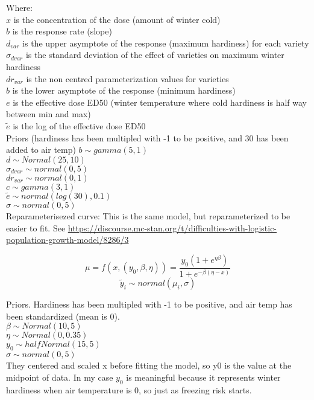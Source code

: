 \documentclass[11pt,letter]{article}
\begin{document}
Where:\\
	$x$ is the concentration of the dose (amount of winter cold) \\
	$b$ is the response rate (slope)\\
	$d_{var}$ is the upper asymptote of the response (maximum hardiness) for each variety\\
	$\sigma_{dvar}$ is the standard deviation of the effect of varieties on maximum winter hardiness\\
	$dr_{var}$ is the non centred parameterization values for varieties \\
	$b$ is the lower asymptote of the response (minimum hardiness)\\
	$e$ is the effective dose ED50 (winter temperature where cold hardiness is half way between min and max)  \\
	$\tilde{e}$ is the log of the effective dose ED50\\

Priors (hardiness has been multipled with -1 to be positive, and 30 has been added to air temp)
	$b \sim gamma(5,1)$\\
	$d \sim Normal(25, 10)$ \\
	$\sigma_{dvar} \sim normal(0,5)$ \\
	$dr_{var} \sim normal(0,1)$ \\
	$c \sim gamma(3,1)$\\
	$\tilde{e} \sim normal(log(30), 0.1)$ \\
	$\sigma \sim normal(0,5)$\\
Reparameterisezed curve:
This is the same model, but reparameterized to be easier to fit. See 
\url{https://discourse.mc-stan.org/t/difficulties-with-logistic-population-growth-model/8286/3}

\begin{equation*}
\mu=f(x,(y_{0},\beta,\eta))=\frac{y_{0}(1 +e^{\eta\beta})}{1+e^{-\beta(\eta - x)}}
\end{equation*}
\begin{equation*}
\tilde{y}_{i}\sim normal(\mu_{i},\sigma)
\end{equation*}

Priors.
Hardiness has been multipled with -1 to be positive, and air temp has been standardized (mean is 0).\\
	$\beta \sim Normal(10,5)$\\
	$\eta \sim Normal(0, 0.35)$ \\
	$y_{0} \sim halfNormal(15,5)$\\
	$\sigma \sim normal(0,5)$\\

They centered and scaled x before fitting the model, so y0 is the value at the midpoint of data. In my case 
$y_{0}$ is meaningful because it represents winter hardiness when air temperature is 0, so just as freezing risk starts. 
 














\end{document}
